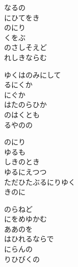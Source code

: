\documentclass[10pt,b5j]{tarticle} %
\begin{document}
\vspace{1.5em} %
\newcommand{\linespace}{0.5em} %
\newcommand{\blocksize}{0.5\hsize} %
\begin{enumerate} %
    \begin{minipage}[c]{\blocksize}
    
        \vspace{\linespace}
        \item
        なるの\\
        にひてをき\\
        のにり\\
        くをぶ\\
        のさしそえど\\
        れしきならむ
        
        \vspace{\linespace}
        \item
        ゆくはのみにして\\
        るにくか\\
        にぐか\\
        はたのらひか\\
        のはくとも\\
        るやのの
        
        \vspace{\linespace}
        \item
        のにり\\
        ゆるも\\
        しきのとき\\
        ゆるにえつつ\\
        ただひたぶるにりゆく\\
        きのに
        
        \vspace{\linespace}
        \item
        のらねど\\
        にをめゆかむ\\
        ああのを\\
        はひれるならで\\
        にらんの\\
        りひびくの
        

\end{minipage}
\end{enumerate}
\end{document}
